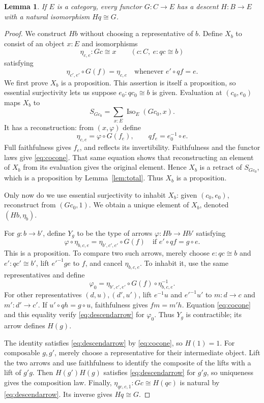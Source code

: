 \documentclass[11pt]{amsart}
\newtheorem{lemma}[theorem]{Lemma}
\theoremstyle{definition}
\theoremstyle{remark}
\newcommand{\Iso}{\operatorname{Iso}}
\begin{document}
\begin{lemma}\label{lem:descent}
If $E$ is a category, every functor $G:C\to E$ has a descent
$H:B\to E$ with a natural isomorphism $Hq\cong G$.
\end{lemma}
\begin{proof}
We construct $Hb$ without choosing a representative of $b$. Define $X_b$
to consist of an object $x:E$ and isomorphisms
\[
 \eta_{c,e}:Gc\cong x\qquad(c:C,\ e:qc\cong b)
\]
satisfying
\begin{equation}\label{eq:cocone}
 \eta_{c',e'}\circ G(f)=\eta_{c,e}
 \quad\text{whenever } e'\circ qf=e.
\end{equation}
We first prove $X_b$ is a proposition. This assertion is itself a
proposition, so essential surjectivity lets us suppose
$e_0:qc_0\cong b$ is given. Evaluation at $(c_0,e_0)$ maps $X_b$ to
\[
 S_{Gc_0}=\sum_{x:E}\Iso_E(Gc_0,x).
\]
It has a reconstruction: from $(x,\varphi)$ define
\[
 \eta_{c,e}=\varphi\circ G(f_e),\qquad qf_e=e_0^{-1}\circ e.
\]
Full faithfulness gives $f_e$, and reflects its invertibility.
Faithfulness and the functor laws give \eqref{eq:cocone}. That same
equation shows that reconstructing an element of $X_b$ from its evaluation
gives the original element. Hence $X_b$ is a retract of $S_{Gc_0}$,
which is a proposition by Lemma~\ref{lem:total}. Thus $X_b$ is a proposition.

Only now do we use essential surjectivity to inhabit $X_b$: given
$(c_0,e_0)$, reconstruct from $(Gc_0,1)$. We obtain a unique element of
$X_b$, denoted $(Hb,\eta_b)$.

For $g:b\to b'$, define $Y_g$ to be the type of arrows
$\varphi:Hb\to Hb'$ satisfying
\begin{equation}\label{eq:descendarrow}
 \varphi\circ\eta_{b,c,e}
   =\eta_{b',c',e'}\circ G(f)
 \quad\text{if }e'\circ qf=g\circ e.
\end{equation}
This is a proposition. To compare two such arrows, merely choose
$e:qc\cong b$ and $e':qc'\cong b'$, lift $e'^{-1}ge$ to $f$, and cancel
$\eta_{b,c,e}$. To inhabit it, use the same representatives and define
\[
 \varphi_0=\eta_{b',c',e'}\circ G(f)\circ\eta_{b,c,e}^{-1}.
\]
For other representatives $(d,u),(d',u')$, lift $e^{-1}u$ and
$e'^{-1}u'$ to $m:d\to c$ and $m':d'\to c'$. If
$u'\circ qh=g\circ u$, faithfulness gives $fm=m'h$.
Equation \eqref{eq:cocone} and this equality verify
\eqref{eq:descendarrow} for $\varphi_0$. Thus $Y_g$ is contractible;
its arrow defines $H(g)$.

The identity satisfies \eqref{eq:descendarrow} by
\eqref{eq:cocone}, so $H(1)=1$. For composable $g,g'$, merely choose a
representative for their intermediate object. Lift the two arrows and
use faithfulness to identify the composite of the lifts with a lift of
$g'g$. Then $H(g')H(g)$ satisfies \eqref{eq:descendarrow} for $g'g$,
so uniqueness gives the composition law. Finally,
$\eta_{qc,c,1}:Gc\cong H(qc)$ is natural by
\eqref{eq:descendarrow}. Its inverse gives $Hq\cong G$.
\end{proof}
\end{document}
